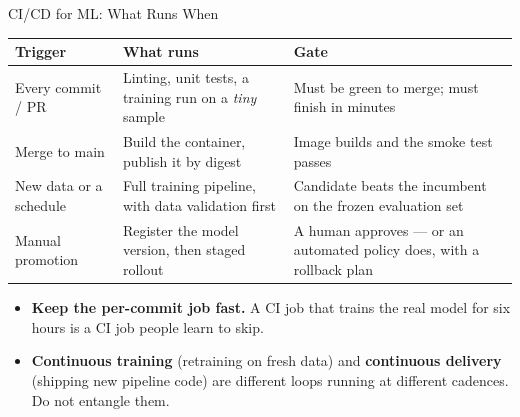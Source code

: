 
\begin{frame}{CI/CD for ML: What Runs When}

    \centering
    \renewcommand{\arraystretch}{1.3}
    {\small
    \begin{tabular}{p{3.0cm}|p{4.2cm}|p{4.2cm}}
        \toprule
        \textbf{Trigger} & \textbf{What runs} & \textbf{Gate} \\
        \midrule
        Every commit / PR & Linting, unit tests, a training run on a \emph{tiny} sample &
            Must be green to merge; must finish in minutes \\
        Merge to main     & Build the container, publish it by digest &
            Image builds and the smoke test passes \\
        New data or a schedule & Full training pipeline, with data validation first &
            Candidate beats the incumbent on the frozen evaluation set \\
        Manual promotion  & Register the model version, then staged rollout &
            A human approves --- or an automated policy does, with a rollback plan \\
        \bottomrule
    \end{tabular}}

    \vspace{0.9em}
    \begin{itemize}
        \item \textbf{Keep the per-commit job fast.} A CI job that trains the real model for six hours is a
              CI job people learn to skip.
        \item \textbf{Continuous training} (retraining on fresh data) and \textbf{continuous delivery}
              (shipping new pipeline code) are different loops running at different cadences. Do not
              entangle them.
    \end{itemize}

\end{frame}
